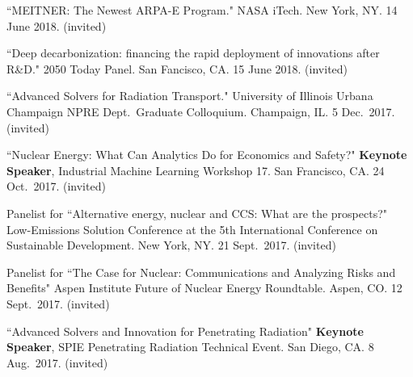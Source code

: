 \begin{bibsection}
\item ``MEITNER: The Newest ARPA-E Program." NASA iTech. New York, NY. 14 June 2018. (invited)

\item ``Deep decarbonization: financing the rapid deployment of innovations after R\&D." 2050 Today Panel. San Fancisco, CA. 15 June 2018. (invited)




\item ``Advanced Solvers for Radiation Transport." University of Illinois Urbana Champaign NPRE Dept.\ Graduate Colloquium. Champaign, IL. 5 Dec.\ 2017. (invited)


\item ``Nuclear Energy: What Can Analytics Do for Economics and Safety?" \textbf{Keynote Speaker}, Industrial Machine Learning Workshop 17. San Francisco, CA. 24 Oct.\ 2017. (invited)

\item Panelist for ``Alternative energy, nuclear and CCS: What are the prospects?" Low-Emissions Solution Conference at the 5th International Conference on Sustainable Development. New York, NY. 21  Sept.\ 2017. (invited)

\item Panelist for ``The Case for Nuclear: Communications and Analyzing Risks and Benefits" Aspen Institute Future of Nuclear Energy Roundtable. Aspen, CO. 12  Sept.\ 2017. (invited)

\item ``Advanced Solvers and Innovation for Penetrating Radiation" \textbf{Keynote Speaker}, SPIE Penetrating Radiation Technical Event. San Diego, CA. 8 Aug.\ 2017. (invited)


\end{bibsection}
